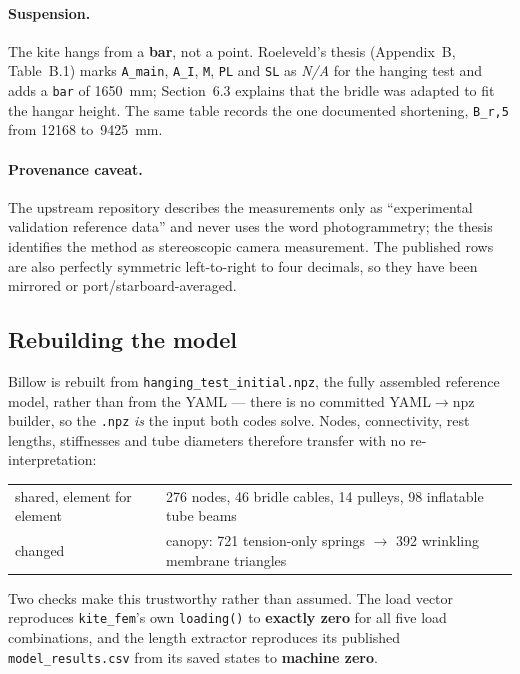 \documentclass[11pt,a4paper]{article}
\begin{document}
\paragraph{Suspension.} The kite hangs from a \textbf{bar}, not a point.
Roeleveld's thesis (Appendix~B, Table~B.1) marks \texttt{A\_main},
\texttt{A\_I}, \texttt{M}, \texttt{PL} and \texttt{SL} as \emph{N/A} for the
hanging test and adds a \texttt{bar} of \SI{1650}{mm}; Section~6.3 explains
that the bridle was adapted to fit the hangar height. The same table records
the one documented shortening, \texttt{B\_r,5} from \SI{12168}{}
to~\SI{9425}{mm}.

\paragraph{Provenance caveat.} The upstream repository describes the
measurements only as ``experimental validation reference data'' and never uses
the word photogrammetry; the thesis identifies the method as stereoscopic
camera measurement. The published rows are also perfectly symmetric
left-to-right to four decimals, so they have been mirrored or
port/starboard-averaged.

\subsection{Rebuilding the model}

Billow is rebuilt from \texttt{hanging\_test\_initial.npz}, the fully assembled
reference model, rather than from the YAML --- there is no committed
YAML$\rightarrow$npz builder, so the \texttt{.npz} \emph{is} the input both
codes solve. Nodes, connectivity, rest lengths, stiffnesses and tube diameters
therefore transfer with no re-interpretation:

\begin{center}
\begin{tabular}{ll}
\toprule
shared, element for element & 276 nodes, 46 bridle cables, 14 pulleys,
                              98 inflatable tube beams \\
changed & canopy: 721 tension-only springs $\rightarrow$ 392 wrinkling
          membrane triangles \\
\bottomrule
\end{tabular}
\end{center}

Two checks make this trustworthy rather than assumed. The load vector
reproduces \texttt{kite\_fem}'s own \texttt{loading()} to \textbf{exactly zero}
for all five load combinations, and the length extractor reproduces its
published \texttt{model\_results.csv} from its saved states to
\textbf{machine zero}.
\end{document}
